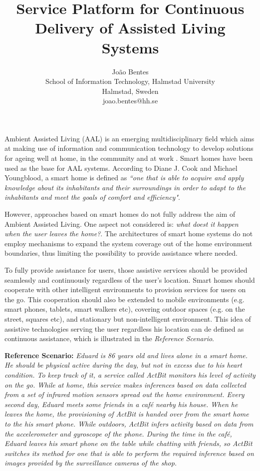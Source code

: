\documentclass[]{scrartcl}
\title{Service Platform for Continuous Delivery of Assisted Living Systems}
\author{
Jo\~{a}o Bentes\\
School of Information Technology, Halmstad University\\
Halmstad, Sweden\\
joao.bentes@hh.se
}
\begin{document}
\maketitle

Ambient Assisted Living (AAL) is an emerging multidisciplinary field which aims at making use of information and communication technology to develop solutions for ageing well at home, in the community and at work \cite{living2011ambient}.
Smart homes have been used as the base for AAL systems. 
According to Diane J. Cook and Michael Youngblood, a smart home is defined as \textit{``one that is able to acquire and apply knowledge about its inhabitants and their surroundings in order to adapt to the inhabitants and meet the goals of comfort and efficiency"}.

However, approaches based on smart homes do not fully address the aim of Ambient Assisted Living. 
One aspect not considered is: \textit{what doest it happen when the user leaves the home?}. 
The architectures of smart home systems do not employ mechanisms to expand the system coverage out of the home environment boundaries, thus limiting the possibility to provide assistance where needed.

To fully provide assistance for users, those assistive services should be provided seamlessly and continuously regardless of the user's location. 
Smart homes should cooperate with other intelligent environments to provision services for users on the go. 
This cooperation should also be extended to mobile environments (e.g. smart phones, tablets, smart walkers etc), covering outdoor spaces (e.g. on the street, squares etc), and stationary but non-intelligent environment.
This idea of assistive technologies serving the user regardless his location can de defined as continuous assistance, which is illustrated in the \textit{Reference Scenario}.

\textbf{Reference Scenario:} \textit{Eduard is 86 years old and lives alone in a smart home.
	He should be physical active during the day, but not in excess due to his heart condition.
	To keep track of it, a service called \textit{ActBit} monitors his level of activity on the go.
	While at home, this service makes inferences based on data collected from a set of infrared motion sensors spread out the home environment. 
	Every second day, Eduard meets some friends in a caf\'{e} nearby his house.
	When he leaves the home, the provisioning of \textit{ActBit} is handed over from the smart home to the his smart phone.
	While outdoors, \textit{ActBit} infers activity based on data from the accelerometer and gyroscope of the phone.
	During the time in the caf\'{e}, Eduard leaves his smart phone on the table while chatting with friends, so \textit{ActBit} switches its method for one that is able to perform the required inference based on images provided by the surveillance cameras of the shop.} 
\end{document}
